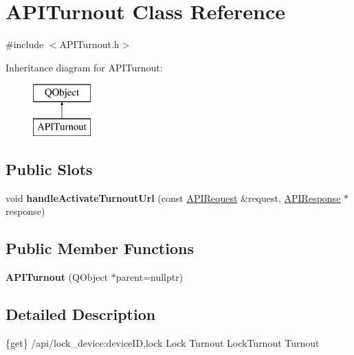 \hypertarget{class_a_p_i_turnout}{}\section{A\+P\+I\+Turnout Class Reference}
\label{class_a_p_i_turnout}


{\ttfamily \#include $<$A\+P\+I\+Turnout.\+h$>$}

Inheritance diagram for A\+P\+I\+Turnout\+:\begin{figure}[H]
\begin{center}
\leavevmode
\includegraphics[height=2.000000cm]{class_a_p_i_turnout}
\end{center}
\end{figure}
\subsection*{Public Slots}
\begin{DoxyCompactItemize}
\item 
\mbox{\label{class_a_p_i_turnout_a56cef33f12b9d8c13aa8cdce7e24bf0c}} 
void {\bfseries handle\+Activate\+Turnout\+Url} (const \hyperlink{class_a_p_i_request}{A\+P\+I\+Request} \&request, \hyperlink{class_a_p_i_response}{A\+P\+I\+Response} $\ast$response)
\end{DoxyCompactItemize}
\subsection*{Public Member Functions}
\begin{DoxyCompactItemize}
\item 
\mbox{\label{class_a_p_i_turnout_a6c730f3cc2cee54be17e110770b9070b}} 
{\bfseries A\+P\+I\+Turnout} (Q\+Object $\ast$parent=nullptr)
\end{DoxyCompactItemize}


\subsection{Detailed Description}
\{get\} /api/lock\+\_\+device\+:device\+ID,lock Lock Turnout  Lock\+Turnout  Turnout

